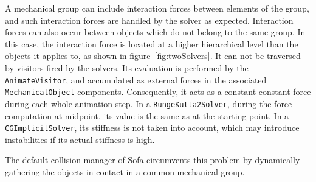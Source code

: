 A mechanical group can include interaction forces between elements of the group, and such interaction forces are handled by the solver as expected.
Interaction forces can also occur between objects which do not belong to the same group.
In this case, the interaction force is located at a higher hierarchical level than the objects it applies to, as shown in figure~\ref{fig:twoSolvers}.
It can not be traversed by visitors fired by the solvers.
Its evaluation is performed by the \texttt{AnimateVisitor}, and accumulated as external forces in the associated \texttt{MechanicalObject} components.
Consequently, it acts as a constant constant force during each whole animation step.
In a \texttt{RungeKutta2Solver}, during the force computation at midpoint, its value is the same as at the starting point.
In a \texttt{CGImplicitSolver}, its stiffness is not taken into account, which may introduce instabilities if its actual stiffness is high.

The default collision manager of Sofa circumvents this problem by dynamically gathering the objects in contact in a common mechanical group.

% 
% 
% 

